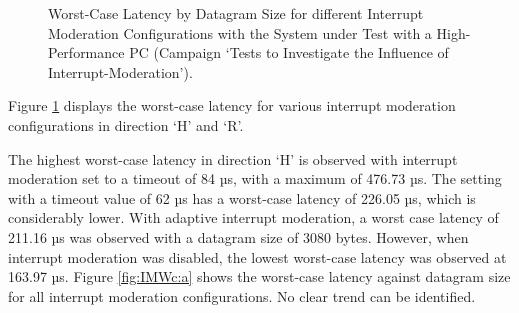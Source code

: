 \begin{figure}[h!]
  \centering
  \caption{Worst-Case Latency by Datagram Size for different Interrupt Moderation Configurations with the System under Test with a High-Performance PC (Campaign `Tests to Investigate the Influence of Interrupt-Moderation').}
  \label{fig:IMWc}
\end{figure}

Figure \ref{fig:IMWc} displays the worst-case latency for various interrupt moderation configurations in direction `H' and `R'.

The highest worst-case latency in direction `H' is observed with interrupt moderation set to a timeout of 84 µs, with a maximum of 476.73 µs. The setting with a timeout value of 62 µs has a worst-case latency of 226.05 µs, which is considerably lower. With adaptive interrupt moderation, a worst case latency of 211.16 µs was observed with a datagram size of 3080 bytes. However, when interrupt moderation was disabled, the lowest worst-case latency was observed at 163.97 µs. Figure \ref{fig:IMWc:a} shows the worst-case latency against datagram size for all interrupt moderation configurations. No clear trend can be identified.

